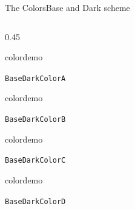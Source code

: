 \documentclass[final]{beamer}
\begin{document}
\begin{frame}{The Colors}{Base and Dark scheme}
\begin{columns}
\begin{column}{0.45\textwidth}
\begin{beamercolorbox}[dp=0pt,sep=0em,wd=\bwidth,ht=10cm]{}
%
\begin{beamercolorbox}[sep=0em,wd=2cm,ht=2cm]{colordemo}
\end{beamercolorbox}\quad\texttt{BaseDarkColorA}\hfill\newline%
%
\begin{beamercolorbox}[sep=0em,wd=2cm,ht=2cm]{colordemo}%
\end{beamercolorbox}\quad\texttt{BaseDarkColorB}\hfill\newline%
%
\begin{beamercolorbox}[sep=0em,wd=2cm,ht=2cm]{colordemo}%
\end{beamercolorbox}\quad\texttt{BaseDarkColorC}\hfill\newline%
%
\begin{beamercolorbox}[sep=0em,wd=2cm,ht=2cm]{colordemo}%
\end{beamercolorbox}\quad\texttt{BaseDarkColorD}%
\end{beamercolorbox}%
\end{column}
\end{columns}
\end{frame}
%
%
%
%
%
\end{document}
